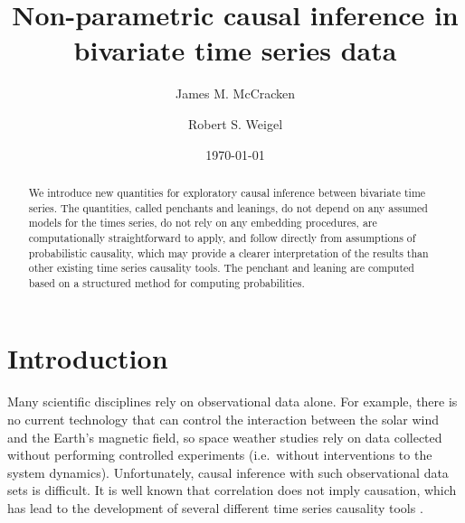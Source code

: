 \documentclass[twocolumn,aps,pre,groupedaddress]{revtex4-1}
\begin{document}
\title{Non-parametric causal inference in bivariate time series data}
\author{James M. McCracken}
\author{Robert S. Weigel}
\date{\today}

\begin{abstract}
We introduce new quantities for exploratory causal inference between bivariate time series.  The quantities, called penchants and leanings, do not depend on any assumed models for the times series, do not rely on any embedding procedures, are computationally straightforward to apply, and follow directly from assumptions of probabilistic causality, which may provide a clearer interpretation of the results than other existing time series causality tools.  The penchant and leaning are computed based on a structured method for computing probabilities.
\end{abstract}

\maketitle

\section{Introduction}
Many scientific disciplines rely on observational data alone.  For example, there is no current technology that can control the interaction between the solar wind and the Earth's magnetic field, so space weather studies rely on data collected without performing controlled experiments (i.e.\ without interventions to the system dynamics).  Unfortunately, causal inference with such observational data sets is difficult.  It is well known that correlation does not imply causation, which has lead to the development of several different time series causality tools \cite{Schreiber2000,granger1969,Rogosa1980,Pearl2000,kleinberg2012}.
\end{document}
